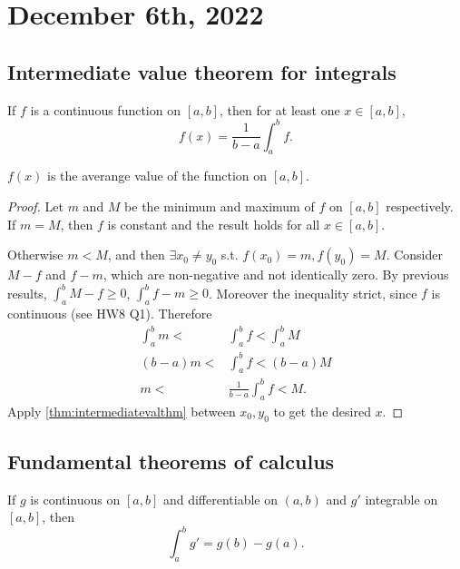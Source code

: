 \documentclass[11pt]{scrartcl}
\numberwithin{equation}{section}
\begin{document}
\section{December 6th, 2022}

\subsection{Intermediate value theorem for integrals}

\begin{theorem}
    If $f$ is a continuous function on $[a,b]$, then 
    for at least one $x\in[a,b]$,
    \[
        f(x) = \frac{1}{b-a}\int_a^bf.
    \]
\end{theorem}
$f(x)$ is the averange value of the function on $[a,b]$.

\begin{proof}
    Let $m$ and $M$ be the minimum and maximum of $f$ on $[a,b]$ respectively.
    If $m=M$, then $f$ is constant and the result holds for all $x\in[a,b]$.
    
    Otherwise $m<M$, and then $\exists x_0\neq y_0$ s.t. 
    $f(x_0) = m, f(y_0) = M$. Consider $M-f$ and $f-m$, which are non-negative and not identically zero.
    By previous results, $\int_{a}^{b}M-f\geq 0$, $\int_{a}^{b}f-m\geq 0$.
    Moreover the inequality strict, since $f$ is continuous (see HW8 Q1).
    Therefore 
    \begin{align*}
        \int_{a}^{b}m < &\int_{a}^{b}f < \int_{a}^{b}M \\
        (b-a)m < &\int_{a}^{b}f<(b-a)M\\
        m < &\frac{1}{b-a}\int_{a}^{b}f<M.
    \end{align*}
    Apply \cref{thm:intermediatevalthm} between $x_0, y_0$ to get 
    the desired $x$.
\end{proof}

\subsection{Fundamental theorems of calculus}

\begin{theorem}
    \label{thm:fundthmcalc}
    If $g$ is continuous on $[a,b]$ and differentiable on $(a,b)$
    and $g'$ integrable on $[a,b]$, then 
    \[
        \int_{a}^{b}g' = g(b)-g(a).
    \]
\end{theorem}
\end{document}
